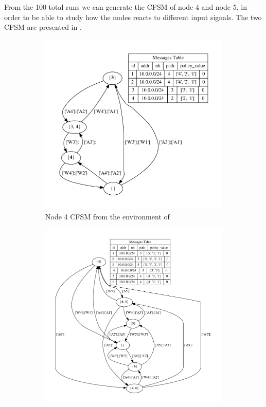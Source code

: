 From the \num{100} total runs we can generate the \ac{CFSM} of node \num{4} and
node \num{5}, in order to be able to study how the nodes reacts to different
input signals.
The two \ac{CFSM} are presented in .

\begin{figure}[h]
     \centering
     \begin{subfigure}[b]{0.45\textwidth}
         \centering
         \includegraphics[width=\textwidth]{images/fsm/fig_4_4.pdf}
		 \caption{Node \num{4} \ac{CFSM} from the environment of }
         \label{fig:fsm_node4}
     \end{subfigure}
     \hfill
     \begin{subfigure}[b]{0.45\textwidth}
         \centering
         \includegraphics[width=\textwidth]{images/fsm/fig_4_5.pdf}

\end{subfigure}
\end{figure}
